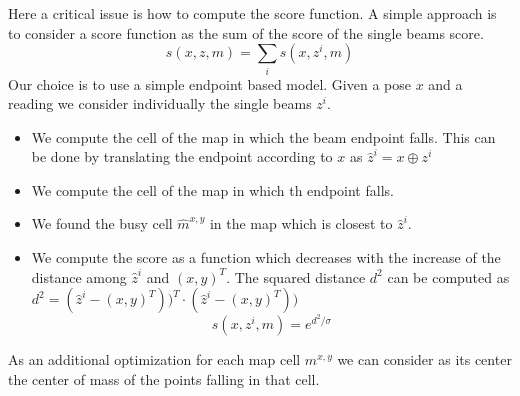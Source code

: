 \documentclass[a4paper]{article}
\begin{document}
Here a critical issue is how to compute the score function.
A simple approach is to consider a score function as  the sum of the score of the single beams score.
\begin{equation}
s(x,z,m)=\sum_i s(x,z^i,m)
\nonumber
\end{equation}
Our choice is to use a simple endpoint based model. Given a pose $x$ and a reading we consider individually the single beams $z^i$. 
\begin{itemize}
\item We compute the cell of the map in which the beam endpoint falls. This can be done by translating the endpoint according to $x$ as  $\hat z^i= x \oplus z^i$
\item We compute the cell of the map in which th endpoint falls.
\item We found the busy cell $\hat m^{x,y}$ in the map which is closest to $\hat z^i$.
\item We compute the score as a function which decreases with the increase of the distance among $\hat z^i$ and $(x,y)^T$. The squared distance $d^2$ can be computed as $d^2=(\hat z^i- (x,y)^T))^T\cdot(\hat z^i- (x,y)^T))$
\begin{equation}
s(x,z^i,m) = e^{d^2/\sigma}
\nonumber
\end{equation}
\end{itemize}
As an additional optimization for each map cell $m^{x,y}$ we can consider as its center the center of mass of the points falling in that cell.
\end{document}
